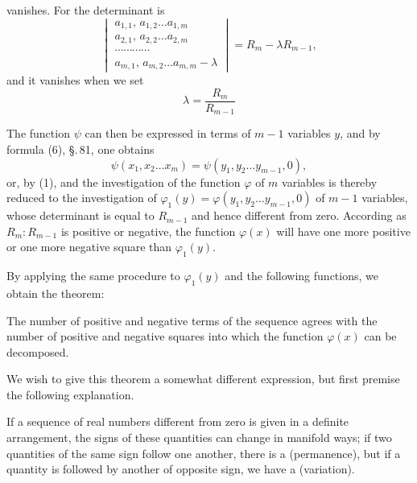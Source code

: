 
vanishes. For the determinant is
\[
\begin{vmatrix}
a_{1,1},\, a_{1,2} \ldots a_{1,m} \\
a_{2,1},\, a_{2,2} \ldots a_{2,m} \\
\cdots\cdots\cdots\cdots \\
a_{m,1},\, a_{m,2} \ldots a_{m,m} - \lambda
\end{vmatrix}
= R_m - \lambda R_{m-1},
\]
and it vanishes when we set
\[
\lambda = \frac{R_m}{R_{m-1}}
\]

The function $\psi$ can then be expressed in terms of $m-1$ variables $y$, and by formula (6), \S.\,81, one obtains
\[
\psi(x_1, x_2 \ldots x_m) = \psi(y_1, y_2 \ldots y_{m-1}, 0),
\]
or, by (1),
and the investigation of the function $\varphi$ of $m$ variables is thereby reduced to the investigation of $\varphi_1(y) = \varphi(y_1, y_2 \ldots y_{m-1}, 0)$ of $m-1$ variables, whose determinant is equal to $R_{m-1}$ and hence different from zero. According as $R_m : R_{m-1}$ is positive or negative, the function $\varphi(x)$ will have one more positive or one more negative square than $\varphi_1(y)$.

By applying the same procedure to $\varphi_1(y)$ and the following functions, we obtain the theorem:

The number of positive and negative terms of the sequence
agrees with the number of positive and negative squares into which the function $\varphi(x)$ can be decomposed.

We wish to give this theorem a somewhat different expression, but first premise the following explanation.

If a sequence of real numbers different from zero is given in a definite arrangement, the signs of these quantities can change in manifold ways; if two quantities of the same sign follow one another, there is a  (permanence), but if a quantity is followed by another of opposite sign, we have a  (variation).
